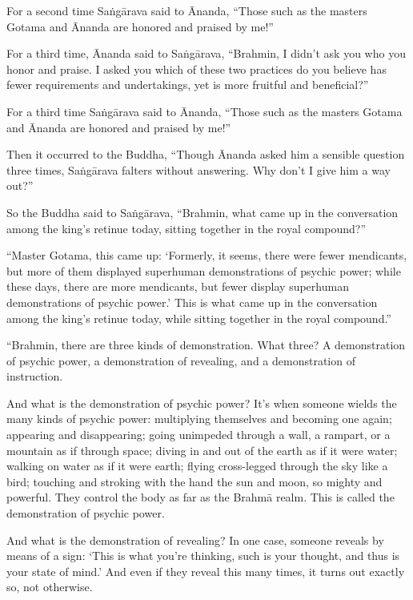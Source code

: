 \documentclass[12pt,openany]{book}%
\begin{document}
For a second time \textsanskrit{Saṅgārava} said to Ānanda, “Those such as the masters Gotama and Ānanda are honored and praised by me!” 

For a third time, Ānanda said to \textsanskrit{Saṅgārava}, “Brahmin, I didn’t ask you who you honor and praise. I asked you which of these two practices do you believe has fewer requirements and undertakings, yet is more fruitful and beneficial?” 

For a third time \textsanskrit{Saṅgārava} said to Ānanda, “Those such as the masters Gotama and Ānanda are honored and praised by me!” 

Then it occurred to the Buddha, “Though Ānanda asked him a sensible question three times, \textsanskrit{Saṅgārava} falters without answering. Why don’t I give him a way out?” 

So the Buddha said to \textsanskrit{Saṅgārava}, “Brahmin, what came up in the conversation among the king’s retinue today, sitting together in the royal compound?” 

“Master Gotama, this came up: ‘Formerly, it seems, there were fewer mendicants, but more of them displayed superhuman demonstrations of psychic power; while these days, there are more mendicants, but fewer display superhuman demonstrations of psychic power.’ This is what came up in the conversation among the king’s retinue today, while sitting together in the royal compound.” 

“Brahmin, there are three kinds of demonstration. What three? A demonstration of psychic power, a demonstration of revealing, and a demonstration of instruction. 

And what is the demonstration of psychic power? It’s when someone wields the many kinds of psychic power: multiplying themselves and becoming one again; appearing and disappearing; going unimpeded through a wall, a rampart, or a mountain as if through space; diving in and out of the earth as if it were water; walking on water as if it were earth; flying cross-legged through the sky like a bird; touching and stroking with the hand the sun and moon, so mighty and powerful. They control the body as far as the \textsanskrit{Brahmā} realm. This is called the demonstration of psychic power. 

And what is the demonstration of revealing? In one case, someone reveals by means of a sign: ‘This is what you’re thinking, such is your thought, and thus is your state of mind.’ And even if they reveal this many times, it turns out exactly so, not otherwise. 
\end{document}
